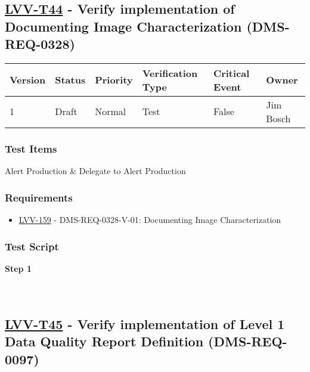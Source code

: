 \hypertarget{lvv-t44---verify-implementation-of-documenting-image-characterization-dms-req-0328}{%
\subsection{\texorpdfstring{\href{https://jira.lsstcorp.org/secure/Tests.jspa\#/testCase/LVV-T44}{LVV-T44}
- Verify implementation of Documenting Image Characterization
(DMS-REQ-0328)}{LVV-T44 - Verify implementation of Documenting Image Characterization (DMS-REQ-0328)}}\label{lvv-t44---verify-implementation-of-documenting-image-characterization-dms-req-0328}}

\begin{longtable}[]{@{}llllll@{}}
\toprule
Version & Status & Priority & Verification Type & Critical Event &
Owner\tabularnewline
\midrule
\endhead
1 & Draft & Normal & Test & False & Jim Bosch\tabularnewline
\bottomrule
\end{longtable}

\hypertarget{test-items-20}{%
\subsubsection{Test Items}\label{test-items-20}}

Alert Production \& Delegate to Alert Production

\hypertarget{requirements-21}{%
\subsubsection{Requirements}\label{requirements-21}}

\begin{itemize}
\tightlist
\item
  \href{https://jira.lsstcorp.org/browse/LVV-159}{LVV-159} -
  DMS-REQ-0328-V-01: Documenting Image Characterization
\end{itemize}

\hypertarget{test-script-21}{%
\subsubsection{Test Script}\label{test-script-21}}

\textbf{Step 1}\\
~\\
~\\

\hypertarget{lvv-t45---verify-implementation-of-level-1-data-quality-report-definition-dms-req-0097}{%
\subsection{\texorpdfstring{\href{https://jira.lsstcorp.org/secure/Tests.jspa\#/testCase/LVV-T45}{LVV-T45}
- Verify implementation of Level 1 Data Quality Report Definition
(DMS-REQ-0097)}{LVV-T45 - Verify implementation of Level 1 Data Quality Report Definition (DMS-REQ-0097)}}\label{lvv-t45---verify-implementation-of-level-1-data-quality-report-definition-dms-req-0097}}

